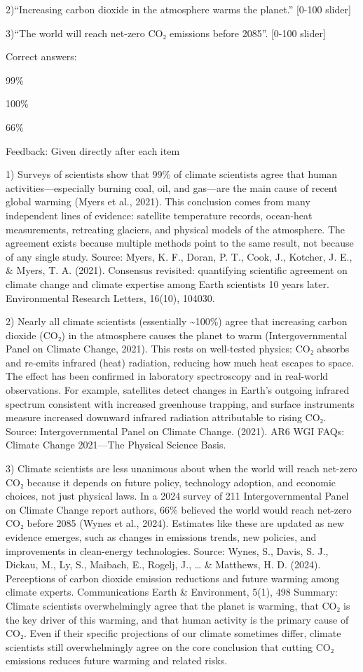 \documentclass[
  letterpaper,
  DIV=11,
  numbers=noendperiod]{scrartcl}
\begin{document}
2)``Increasing carbon dioxide in the atmosphere warms the planet.''
{[}0-100 slider{]}

3)``The world will reach net-zero CO₂ emissions before 2085''. {[}0-100
slider{]}

Correct answers:

99\%

100\%

66\%

Feedback: Given directly after each item

1) Surveys of scientists show that 99\% of climate scientists agree that
human activities---especially burning coal, oil, and gas---are the main
cause of recent global warming (Myers et al., 2021). This conclusion
comes from many independent lines of evidence: satellite temperature
records, ocean-heat measurements, retreating glaciers, and physical
models of the atmosphere. The agreement exists because multiple methods
point to the same result, not because of any single study. Source:
Myers, K. F., Doran, P. T., Cook, J., Kotcher, J. E., \& Myers, T. A.
(2021). Consensus revisited: quantifying scientific agreement on climate
change and climate expertise among Earth scientists 10 years later.
Environmental Research Letters, 16(10), 104030.

2) Nearly all climate scientists (essentially \textasciitilde100\%)
agree that increasing carbon dioxide (CO₂) in the atmosphere causes the
planet to warm (Intergovernmental Panel on Climate Change, 2021). This
rests on well-tested physics: CO₂ absorbs and re-emits infrared (heat)
radiation, reducing how much heat escapes to space. The effect has been
confirmed in laboratory spectroscopy and in real-world observations. For
example, satellites detect changes in Earth's outgoing infrared spectrum
consistent with increased greenhouse trapping, and surface instruments
measure increased downward infrared radiation attributable to rising
CO₂. Source: Intergovernmental Panel on Climate Change. (2021). AR6 WGI
FAQs: Climate Change 2021---The Physical Science Basis.

3) Climate scientists are less unanimous about when the world will reach
net-zero CO₂ because it depends on future policy, technology adoption,
and economic choices, not just physical laws. In a 2024 survey of 211
Intergovernmental Panel on Climate Change report authors, 66\% believed
the world would reach net-zero CO₂ before 2085 (Wynes et al., 2024).
Estimates like these are updated as new evidence emerges, such as
changes in emissions trends, new policies, and improvements in
clean-energy technologies. Source: Wynes, S., Davis, S. J., Dickau, M.,
Ly, S., Maibach, E., Rogelj, J., \ldots{} \& Matthews, H. D. (2024).
Perceptions of carbon dioxide emission reductions and future warming
among climate experts. Communications Earth \& Environment, 5(1), 498
Summary: Climate scientists overwhelmingly agree that the planet is
warming, that CO₂ is the key driver of this warming, and that human
activity is the primary cause of CO₂. Even if their specific projections
of our climate sometimes differ, climate scientists still overwhelmingly
agree on the core conclusion that cutting CO₂ emissions reduces future
warming and related risks.
\end{document}
